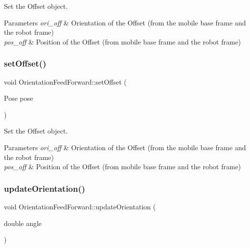 Set the Offset object. 


\begin{DoxyParams}{Parameters}
{\em ori\+\_\+off} & Orientation of the Offset (from the mobile base frame and the robot frame) \\
\hline
{\em pos\+\_\+off} & Position of the Offset (from mobile base frame and the robot frame) \\
\hline
\end{DoxyParams}
\mbox{\label{classOrientationFeedForward_adbd1691b1e930752818624d065acbf1c}} 
\subsubsection{\texorpdfstring{set\+Offset()}{setOffset()}\hspace{0.1cm}{\footnotesize\ttfamily [2/2]}}
{\footnotesize\ttfamily void Orientation\+Feed\+Forward\+::set\+Offset (\begin{DoxyParamCaption}\item[{Pose}]{pose }\end{DoxyParamCaption})}



Set the Offset object. 


\begin{DoxyParams}{Parameters}
{\em ori\+\_\+off} & Orientation of the Offset (from the mobile base frame and the robot frame) \\
\hline
{\em pos\+\_\+off} & Position of the Offset (from mobile base frame and the robot frame) \\
\hline
\end{DoxyParams}
\mbox{\label{classOrientationFeedForward_aa7d8913f8f9d90e913b478d9adc5ff20}} 
\subsubsection{\texorpdfstring{update\+Orientation()}{updateOrientation()}\hspace{0.1cm}{\footnotesize\ttfamily [1/2]}}
{\footnotesize\ttfamily void Orientation\+Feed\+Forward\+::update\+Orientation (\begin{DoxyParamCaption}\item[{double}]{angle }\end{DoxyParamCaption})}



